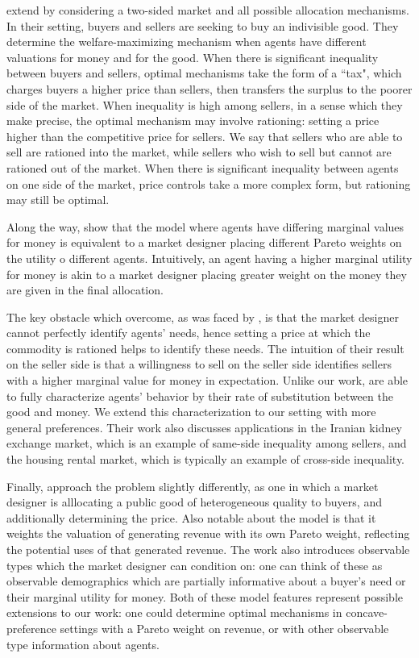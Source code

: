 \documentclass[AER]{AEA}
\begin{document}

\cite{dworczak-2020} extend \cite{weitzman-1977} by considering a two-sided market and all possible allocation mechanisms. In their setting, buyers and sellers are seeking to buy an indivisible good. They determine the welfare-maximizing mechanism when agents have different valuations for money and for the good. When there is significant inequality between buyers and sellers, optimal mechanisms take the form of a ``tax", which charges buyers a higher price than sellers, then transfers the surplus to the poorer side of the market. When inequality is high among sellers, in a sense which they make precise, the optimal mechanism may involve rationing: setting a price higher than the competitive price for sellers. We say that sellers who are able to sell are rationed into the market, while sellers who wish to sell but cannot are rationed out of the market. When there is significant inequality between agents on one side of the market, price controls take a more complex form, but rationing may still be optimal.

Along the way, \cite{dworczak-2020} show that the model where agents have differing marginal values for money is equivalent to a market designer placing different Pareto weights on the utility o different agents. Intuitively, an agent having a higher marginal utility for money is akin to a market designer placing greater weight on the money they are given in the final allocation. 

The key obstacle which \cite{dworczak-2020} overcome, as was faced by \cite{weitzman-1977}, is that the market designer cannot perfectly identify agents' needs, hence setting a price at which the commodity is rationed helps to identify these needs. The intuition of their result on the seller side is that a willingness to sell on the seller side identifies sellers with a higher marginal value for money in expectation. Unlike our work, \cite{dworczak-2020} are able to fully characterize agents' behavior by their rate of substitution between the good and money. We extend this characterization to our setting with more general preferences. Their work also discusses applications in the Iranian kidney exchange market, which is an example of same-side inequality among sellers, and the housing rental market, which is typically an example of cross-side inequality.

Finally, \cite{akbarpour-2020} approach the problem slightly differently, as one in which a market designer is alllocating a public good of heterogeneous quality to buyers, and additionally determining the price. Also notable about the \cite{akbarpour-2020} model is that it weights the valuation of generating revenue with its own Pareto weight, reflecting the potential uses of that generated revenue. The work also introduces observable types which the market designer can condition on: one can think of these as observable demographics which are partially informative about a buyer's need or their marginal utility for money. Both of these model features represent possible extensions to our work: one could determine optimal mechanisms in concave-preference settings with a Pareto weight on revenue, or with other observable type information about agents.
\end{document}
